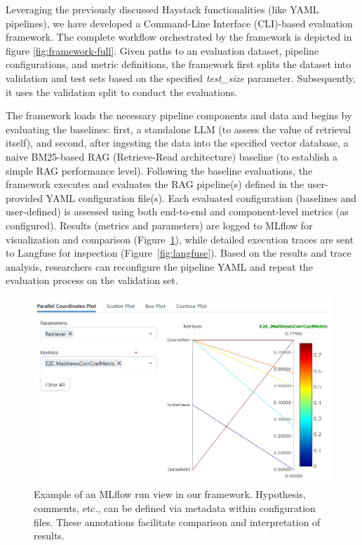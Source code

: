 Leveraging the previously discussed Haystack functionalities (like YAML pipe\-lines), we have developed a Command-Line Interface (CLI)-based evaluation framework. The complete workflow orchestrated by the framework is depicted in figure \ref{fig:framework-full}. Given paths to an evaluation dataset, pipeline configurations, and metric definitions, the framework first splits the dataset into validation and test sets based on the specified \textit{test\_size} parameter. Subsequently, it uses the validation split to conduct the evaluations.

The framework loads the necessary pipeline components and data and begins by evaluating the baselines: first, a standalone LLM (to assess the value of retrieval itself), and second, after ingesting the data into the specified vector database, a naive BM25-based RAG (Retrieve-Read architecture) baseline (to establish a simple RAG performance level). Following the baseline evaluations, the framework executes and evaluates the RAG pipeline(s) defined in the user-provided YAML configuration file(s). Each evaluated configuration (baselines and user-defined) is assessed using both end-to-end and component-level metrics (as configured). Results (metrics and parameters) are logged to MLflow for visualization and comparison (Figure~\ref{fig:mlflow}), while detailed execution traces are sent to Langfuse for inspection (Figure~\ref{fig:langfuse}). Based on the results and trace analysis, researchers can reconfigure the pipeline YAML and repeat the evaluation process on the validation set.

\begin{figure}[!ht]
  \centering
  \includegraphics[width=\textwidth]{images/MLFlow-Vis.png}
  \caption{Example of an MLflow run view in our framework. Hypothesis, comments, etc., can be defined via metadata within configuration files. These annotations facilitate comparison and interpretation of results.}
  \label{fig:mlflow}
\end{figure}

